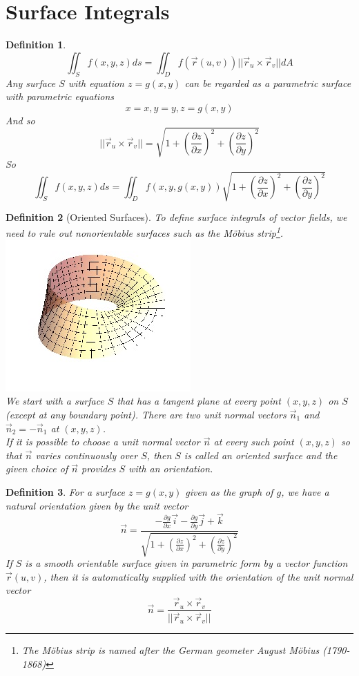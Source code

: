 \documentclass[10pt]{report}
\newtheorem{def2}{Definition}[section]
\begin{document}
\section{Surface Integrals}
\begin{def2}
$$\iint_S f(x,y,z)ds = \iint_D f(\vec{r}(u,v))||\vec{r}_u\times\vec{r}_v||dA$$
Any surface $S$ with equation $z=g(x,y)$ can be regarded as a parametric surface with parametric equations
$$x=x, y=y, z=g(x,y)$$
And so
$$||\vec{r}_u\times\vec{r}_v|| = \sqrt{1 + \left( \frac{\partial z}{\partial x}\right)^2 + \left( \frac{\partial z}{\partial y}\right)^2}$$
So
$$\iint_S f(x,y,z)ds = \iint_D f(x,y,g(x,y))\sqrt{1 + \left( \frac{\partial z}{\partial x}\right)^2 + \left( \frac{\partial z}{\partial y}\right)^2}$$
\end{def2}
\begin{def2}[Oriented Surfaces]
To define surface integrals of vector fields, we need to rule out nonorientable surfaces such as the M\"{o}bius strip\footnote{The M\"{o}bius strip is named after the German geometer August M\"{o}bius (1790-1868)}.
\includegraphics[scale=.75]{Mobius_strip}\\
We start with a surface $S$ that has a tangent plane at every point $(x,y,z)$ on $S$ (except at any boundary point). There are two unit normal vectors $\vec{n}_1$ and $\vec{n}_2 = -\vec{n}_1$ at $(x,y,z)$.\\
If it is possible to choose a unit normal vector $\vec{n}$ at every such point $(x,y,z)$ so that $\vec{n}$ varies continuously over $S$, then $S$ is called an oriented surface and the given choice of $\vec{n}$ provides $S$ with an orientation.
\end{def2}
\begin{def2}
For a surface $z=g(x,y)$ given as the graph of $g$, we have a natural orientation given by the unit vector
$$\vec{n} = \frac{-\frac{\partial g}{\partial x}\vec{i} - \frac{\partial g}{\partial y}\vec{j}+\vec{k}}{\sqrt{1 + \left( \frac{\partial z}{\partial x}\right)^2 + \left( \frac{\partial z}{\partial y}\right)^2}}$$
If $S$ is a smooth orientable surface given in parametric form by a vector function $\vec{r}(u,v)$, then it is automatically supplied with the orientation of the unit normal vector
$$\vec{n} = \frac{\vec{r}_u\times\vec{r}_v}{||\vec{r}_u\times\vec{r}_v||}$$
\end{def2}
\end{document}
